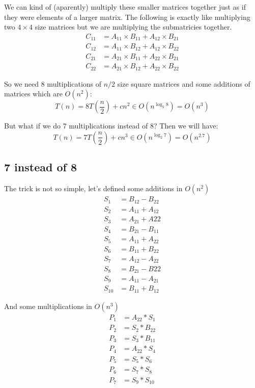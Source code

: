 \documentclass{article}
\begin{document}
We can kind of (aparently) multiply these smaller matrices together just as if they were elements of a larger matrix. The following is exactly like multiplying two $4 \times 4$ size matrices but we are multiplying the submatricies together.
\begin{align*}
    C_{11} &= A_{11} \times B_{11} + A_{12} \times B_{21} \\
    C_{12} &= A_{11} \times B_{12} + A_{12} \times B_{22} \\
    C_{21} &= A_{21} \times B_{11} + A_{22} \times B_{21} \\
    C_{22} &= A_{21} \times B_{12} + A_{22} \times B_{22}
\end{align*}

So we need 8 multiplications of $n/2$ size square matrices and some additions of matrices which are $O(n^2)$:
$$
T(n) = 8T\left(\frac{n}{2}\right) + cn^2 \in O(n^{\log_2{8}}) = O(n^3)
$$

But what if we do 7 multiplications instead of 8? Then we will have:
$$
T(n) = 7 T \left( \frac{n}{2} \right) + cn^3 \in O(n^{\log_2{7}}) = O(n^{2.7})
$$

\subsection{7 instead of 8}
The trick is not so simple, let's defined some additions in $O(n^2)$
\begin{align*}
    S_1 &= B_{12} - B_{22} \\
    S_2 &= A_{11} + A_{12} \\
    S_3 &= A_{21} + A{22} \\
    S_4 &= B_{21} - B_{11} \\
    S_5 &= A_{11} + A_{22} \\
    S_6 &= B_{11} + B_{22} \\
    S_7 &= A_{12} - A_{22} \\
    S_8 &= B_{21} - B{22} \\
    S_9 &= A_{11} - A_{21} \\
    S_{10} &= B_{11} + B_{12}
\end{align*}

And some multiplications in $O(n^3)$
\begin{align*}
    P_1 &= A_{22} * S_1 \\
    P_2 &= S_2 * B_{22} \\
    P_3 &= S_3 * B_{11} \\
    P_4 &= A_{22} * S_{4} \\
    P_5 &= S_5 * S_6 \\
    P_6 &= S_7 * S_8 \\
    P_7 &= S_9 * S_{10}
\end{align*}
\end{document}
